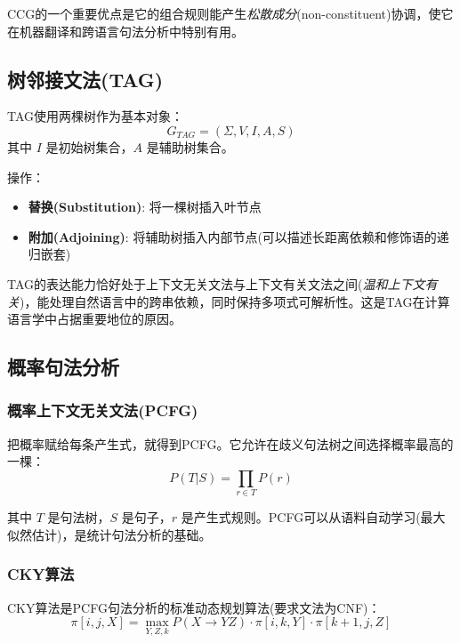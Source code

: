 CCG的一个重要优点是它的组合规则能产生\emph{松散成分}(non-constituent)协调，使它在机器翻译和跨语言句法分析中特别有用。

\subsection{树邻接文法(TAG)}

TAG使用两棵树作为基本对象：
\begin{equation}
    G_{TAG} = (\Sigma, V, I, A, S)
\end{equation}
其中 $I$ 是初始树集合，$A$ 是辅助树集合。

操作：
\begin{itemize}
    \item \textbf{替换(Substitution)}: 将一棵树插入叶节点
    \item \textbf{附加(Adjoining)}: 将辅助树插入内部节点(可以描述长距离依赖和修饰语的递归嵌套)
\end{itemize}

TAG的表达能力恰好处于上下文无关文法与上下文有关文法之间(\emph{温和上下文有关})，能处理自然语言中的跨串依赖，同时保持多项式可解析性。这是TAG在计算语言学中占据重要地位的原因。

\subsection{概率句法分析}

\subsubsection{概率上下文无关文法(PCFG)}

把概率赋给每条产生式，就得到PCFG。它允许在歧义句法树之间选择概率最高的一棵：
\begin{equation}
    P(T|S) = \prod_{r \in T} P(r)
\end{equation}

其中 $T$ 是句法树，$S$ 是句子，$r$ 是产生式规则。PCFG可以从语料自动学习(最大似然估计)，是统计句法分析的基础。

\subsubsection{CKY算法}

CKY算法是PCFG句法分析的标准动态规划算法(要求文法为CNF)：
\begin{equation}
    \pi[i,j,X] = \max_{Y,Z,k} P(X \rightarrow YZ) \cdot \pi[i,k,Y] \cdot \pi[k+1,j,Z]
\end{equation}

